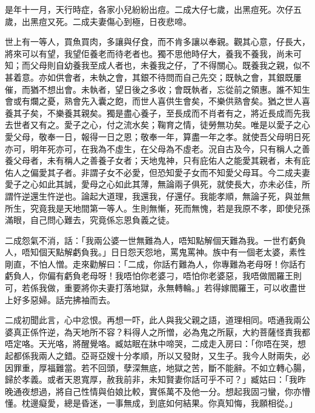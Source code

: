 \documentclass[a5paper, 12pt, openany]{book} %
\begin{document}
	是年十一月，天行時症，各家小兒紛紛出痘。二成大仔七歲，出黑痘死。次仔五歲，出黑痘又死。二成夫妻傷心到極，日夜悲啼。

	世上有一等人，買魚買肉，多讓與仔食，而不肯多讓以奉親。觀其心意，仔長大，將來可以有望，我望佢養老而待老者也。獨不思他時仔大，養我不養我，尚未可知；而父母則自幼養我至成人者也，未養我之仔，了不得關心。既養我之親，似不甚着意。亦如供會者，未執之會，其銀不待問而自己先交；既執之會，其銀既屢催，而猶不想出會。未執者，望日後之多收；會既執者，忘從前之領惠。誰不知生會或有爛之憂，熟會先入囊之飽，而世人喜供生會矣，不樂供熟會矣。猶之世人喜養其子矣，不樂養其親矣。獨是盡心養子，至長成而不肖者有之，將近長成而先我去世者又有之。愛子之心，付之流水矣；鞠育之情，徒勞無功矣。唯是以愛子之心愛父母，敬奉一日，報得一日之恩；敬奉一年，算盡一年之孝。就使吾父母明日死亦可，明年死亦可，在我為不虛生，在父母為不虛老。況自古及今，只有稱人之善養父母者，未有稱人之善養子女者；天地鬼神，只有庇佑人之能愛其親者，未有庇佑人之偏愛其子者。非謂子女不必愛，但恐知愛子女而不知愛父母耳。今二成夫妻愛子之心如此其誠，愛母之心如此其薄，無論兩子俱死，就使長大，亦未必佳，所謂忤逆還生忤逆也。論起大道理，我還我，仔還仔。我能孝順，無論子死，與並無所生，究竟我是天地間第一等人。生則無慚，死而無愧，若是我原不孝，即使兒孫滿眼，自己問心難去，究竟係忘恩負義之徒。

	二成怨氣不消，話：「我兩公婆一世無難為人，唔知點解個天難為我。一世冇虧負人，唔知個天點解虧負我。」日日怨天怨地，罵鬼罵神。族中有一個老太婆，素性剛直，不怕人憎。走來勸解曰：「二成，你話冇難為人，你專難為老母呀！你話冇虧負人，你偏有虧負老母呀！我唔怕你老婆刁，唔怕你老婆惡，我唔做閻羅王則可，若係我做，重要將你夫妻打落地獄，永無轉輪。」若得嫁閻羅王，可以收盡世上好多惡婦。話完拂袖而去。

	二成初聞此言，心中忿恨。再想一吓，此人與我父親之語，道理相同。唔通我兩公婆真正係忤逆，為天地所不容？料得人之所憎，必為鬼之所厭，大約菩薩怪責我都唔定咯。天光咯，將醒覺咯。臧姑眠在牀中啼哭，二成走入房曰：「你唔在哭，想起都係我兩人之錯。亞哥亞嫂十分孝順，所以又發財，又生子。我今人財兩失，必因罪重，厚福難當。若不回頭，孽深無底，地獄之苦，斷不能辭。不如立轉心腸，歸於孝義。或者天恩寬厚，赦我前非，未知賢妻你話可乎不可？」臧姑曰：「我昨晚通夜想過，將自己性情與伯娘比較，實係萬不及他一分。想起我固刁蠻，你亦懵懂。枕邊癡愛，總是昏迷，一事無成，到底如何結果。你真知悔，我願相從。」
\end{document}
